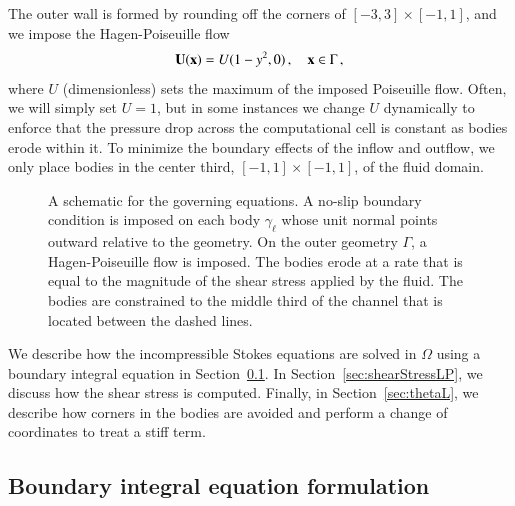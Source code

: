 \documentclass[preprint, 10pt]{elsarticle}
\begin{document}
The outer wall is formed by rounding off the corners of $[-3,3] \times [-1,1]$, and we impose the Hagen-Poiseuille flow
\begin{align}
  {\mathbf{U}}({\mathbf{x}}) = U (1-y^2,0)\, , \quad {\mathbf{x}} \in \Gamma\, ,
\end{align}
where $U$ (dimensionless) sets the maximum of the imposed Poiseuille flow. Often, we will simply set $U=1$, but in some instances we change $U$ dynamically to enforce that the pressure drop across the computational cell is constant as bodies erode within it. To minimize the boundary effects of the inflow and outflow, we only place bodies in the center third, $[-1,1] \times [-1,1]$, of the fluid domain.  

\begin{figure}[htpb]
  \centering
  
  \caption{\label{fig:schematic} A schematic for the governing equations.  A no-slip boundary condition is imposed on each body $\gamma_\ell$ whose unit normal points outward relative to the geometry.  On the outer geometry $\Gamma$, a Hagen-Poiseuille flow is imposed.  The bodies erode at a rate that is equal to the magnitude of the shear stress applied by the fluid.  The bodies are constrained to the middle third of the channel that is located between the dashed lines.}
\end{figure}

We describe how the incompressible Stokes equations are solved in $\Omega$ using a boundary integral equation in Section~\ref{sec:bies}.  In Section~\ref{sec:shearStressLP}, we discuss how the shear stress is computed.  Finally, in Section~\ref{sec:thetaL}, we describe how corners in the bodies are avoided and perform a change of coordinates to treat a stiff term.


\subsection{Boundary integral equation formulation} 
\label{sec:bies}
\end{document}
